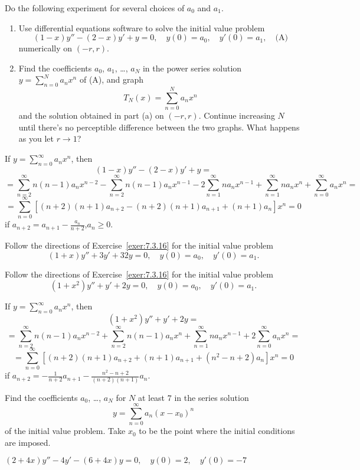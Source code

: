 \documentclass{ximera}
\begin{document}
\begin{problem}\label{exer:7.3.16}
Do the following experiment for several choices of $a_0$
and $a_1$.
\begin{enumerate}
\item %
Use differential equations software  to solve the initial
value problem
$$
(1-x)y''-(2-x)y'+y=0,\quad y(0)=a_0,\quad y'(0)=a_1,\quad
\text{(A)}
$$
numerically on $(-r,r)$.
\item %
Find the coefficients $a_0$, $a_1$, \dots, $a_N$
in the power series solution $y=\sum_{n=0}^Na_nx^n$ of (A), and graph
$$
T_N(x)=\sum_{n=0}^N a_nx^n
$$
and the solution obtained in part (a) on $(-r,r)$.
Continue increasing $N$ until there's no perceptible
difference between the two graphs. What happens as you let $r\to 1$?
\end{enumerate}
\begin{solution}
    If $y=\sum_{n=0}^\infty a_nx^n$, then
$$(1-x)y''-(2-x)y'+y=$$
$$=\sum_{n=2}^\infty n(n-1)a_nx^{n-2}
-\sum_{n=2}^\infty n(n-1)a_nx^{n-1}
-2\sum_{n=1}^\infty na_nx^{n-1}
+\sum_{n=1}^\infty na_nx^n
+\sum_{n=0}^\infty a_nx^n=$$
$$=\sum_{n=0}^\infty[(n+2)(n+1)a_{n+2}-(n+2)(n+1)a_{n+1}+(n+1)a_n]x^n=0$$
if
$a_{n+2}=a_{n+1}-\frac{a_n}{ n+2}$,$a_n\geq 0$.
\end{solution}
\end{problem}


\begin{problem}\label{exer:7.3.17}
Follow the directions of Exercise~\ref{exer:7.3.16} for the
initial value problem
$$
(1+x)y''+3y'+32y=0,\quad y(0)=a_0,\quad y'(0)=a_1.
$$
\end{problem}

\begin{problem}\label{exer:7.3.18}
Follow the directions of Exercise~\ref{exer:7.3.16} for the initial
value problem
$$
(1+x^2)y''+y'+2y=0,\quad y(0)=a_0,\quad y'(0)=a_1.
$$

\begin{solution}
    If $y=\sum_{n=0}^\infty a_nx^n$, then
$$(1+x^2)y''+y'+2y=$$
$$=\sum_{n=2}^\infty n(n-1)a_nx^{n-2}
+\sum_{n=2}^\infty n(n-1)a_nx^n
+\sum_{n=1}^\infty na_nx^{n-1}
+2\sum_{n=0}^\infty a_nx^n=$$
$$=\sum_{n=0}^\infty[(n+2)(n+1)a_{n+2}+(n+1)a_{n+1}+(n^2-n+2)a_n]x^n=0$$
if
 $a_{n+2}=-\frac{1}{ n+2}a_{n+1}-
\frac{n^2-n+2}{(n+2)(n+1)}a_n$.
\end{solution}
\end{problem}


\begin{problem}\label{exer:7.3.19}
Find
the coefficients  $a_0$, \dots, $a_N$  for $N$ at least $7$
in the series solution
$$
y=\sum_{n=0}^\infty a_n(x-x_0)^n
$$
of the
initial value problem. Take $x_0$ to be the point where the initial
conditions are imposed.

$(2+4x)y''-4y'-(6+4x)y=0,\quad y(0)=2,\quad y'(0)=-7$
\end{problem}
\end{document}
